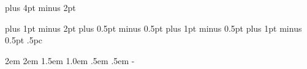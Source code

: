 \documentclass[twoside,letterpaper]{article}
\makeatletter
\newcommand{\Notice@String}{Working research revision. October 4, 2026.}
\def\@copyrightspace{
\@float{copyrightbox}[b]
\begin{center}
\setlength{\unitlength}{1pc}
\begin{picture}(20,2.5)
\put(0,3.5){\line(1,0){4.818}}
\put(0,0){\parbox[b]{19.75pc}{\small \Notice@String}}
\end{picture}
\end{center}
\end@float}
\def\@copyrightspace{}%
\renewcommand{\headrulewidth}{0pt}
\makeatother
\begin{document}
\renewcommand{\headrulewidth}{0.5pt}


\renewenvironment{abstract}
{\@copyrightspace\centerline{\large\bfseries
Abstract}\vspace{0.5ex}\begin{quote}}{\par\end{quote}\vskip 1ex}

\def\section{\@startsection {section}{1}{\z@}{-2.0ex plus
    -0.5ex minus -.2ex}{1.5ex plus 0.3ex minus .2ex}{\large\bfseries\raggedright\MakeUppercase}}
\def\subsection{\@startsection{subsection}{2}{\z@}{-1.8ex plus
    -0.5ex minus -.2ex}{0.8ex plus .2ex}{\normalsize\bfseries\raggedright}}
\def\subsubsection{\@startsection{subsubsection}{3}{\z@}{-1.5ex plus
   -0.5ex minus -.2ex}{0.5ex plus .2ex}{\normalsize\bfseries\raggedright}}
\def\paragraph{\@startsection{paragraph}{4}{\z@}{1.5ex plus
   0.5ex minus .2ex}{-1em}{\normalsize\bfseries}}
\def\subparagraph{\@startsection{subparagraph}{5}{\z@}{1.5ex plus
   0.5ex minus .2ex}{-1em}{\normalsize\bfseries}}
\def\subsubsubsection{\vskip 5pt{\noindent\normalsize\rm\raggedright}}


\footnotesep 6.65pt %
\skip\footins 9pt plus 4pt minus 2pt
\def\footnoterule{\kern-3pt \hrule width 5pc \kern 2.6pt }
\setcounter{footnote}{0}

\parindent 0pt
\topsep 4pt plus 1pt minus 2pt
\partopsep 1pt plus 0.5pt minus 0.5pt
\itemsep 2pt plus 1pt minus 0.5pt
\parsep 2pt plus 1pt minus 0.5pt
\parskip .5pc


\leftmargin 2em \leftmargini\leftmargin \leftmarginii 2em
\leftmarginiii 1.5em \leftmarginiv 1.0em \leftmarginv .5em
\leftmarginvi .5em
\leftmargini\advance{}- {}
\end{document}
